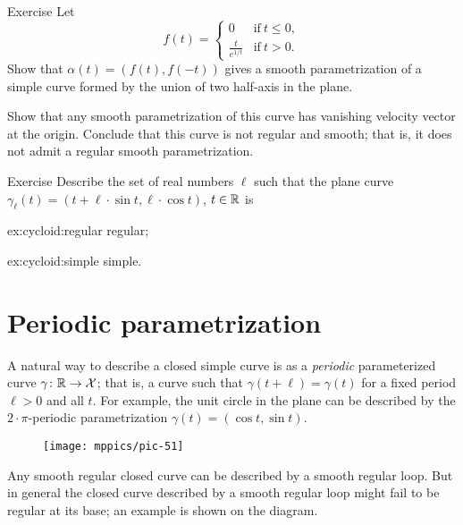 \begin{thm}{Exercise}\label{ex:L-shape}
Let 
\[f(t)=
\begin{cases}
0&\text{if}\ t\le 0,
\\
\frac{t}{e^{1\!/\!t}}&\text{if}\ t> 0.
\end{cases}
\]
Show that $\alpha(t)=(f(t),f(-t))$ gives a smooth parametrization of a simple curve formed by the union of two half-axis in the plane.

Show that any smooth parametrization of this curve has vanishing velocity vector at the origin.
Conclude that this curve is not regular and smooth;
that is, it does not admit a regular smooth parametrization.
\end{thm}


\begin{thm}{Exercise}\label{ex:cycloid}
Describe the set of real numbers $\ell $
such that the plane curve $\gamma_\ell (t)= (t+\ell \cdot \sin t,\ell \cdot \cos t)$, $t\in\mathbb{R}$ is

\begin{subthm}{ex:cycloid:regular}
regular;
\end{subthm}

\begin{subthm}{ex:cycloid:simple}
simple.
\end{subthm}

\end{thm}

\section*{Periodic parametrization}
A natural way to describe a closed simple curve is as a \emph{periodic} parameterized curve $\gamma\colon \mathbb{R}\to \mathcal{X}$; that is, a curve such that $\gamma(t+\ell)=\gamma(t)$ for a fixed period $\ell > 0$ and all $t$.
For example, the unit circle in the plane can be described by the $2{\cdot}\pi$-periodic parametrization $\gamma(t)=(\cos t,\sin t)$.

{

\begin{wrapfigure}{o}{17 mm}
\vskip-3mm
\centering
\texttt{[image: mppics/pic-51]}
\end{wrapfigure}

Any smooth regular closed curve can be described by a smooth regular loop.
But in general the closed curve described by a smooth regular loop might fail to be regular at its base; an example is shown on the diagram.

}

